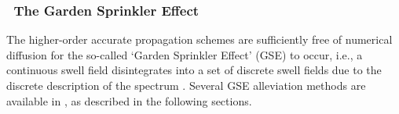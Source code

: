 \vsssub
\subsubsection{~The Garden Sprinkler Effect} \label{sub:num_GSE}
\vsssub

\noindent
The higher-order accurate propagation schemes are sufficiently free of
numerical diffusion for the so-called `Garden Sprinkler Effect' (GSE) to
occur, i.e., a continuous swell field disintegrates into a set of discrete
swell fields due to the discrete description of the spectrum
\citep[Fig.~3c]{art:BH87}. Several GSE alleviation methods are available in
\ws, as described in the following sections.
